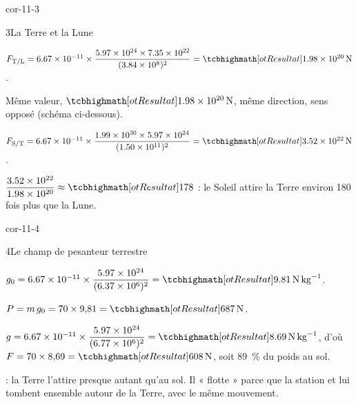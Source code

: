 \begin{blocLivre}{cor-11-3}
\begin{corrige}{3}{La Terre et la Lune}
\begin{questions}
\item $F_{\mathrm{T}/\mathrm{L}}=\num{6,67e-11}\times\dfrac{\num{5,97e24}\times\num{7,35e22}}{(\num{3,84e8})^2}=\res{\qty{1,98e20}{N}}$.
\item Même valeur, $\res{\qty{1,98e20}{N}}$, même direction, sens opposé (schéma ci-dessous).
\item $F_{\mathrm{S}/\mathrm{T}}=\num{6,67e-11}\times\dfrac{\num{1,99e30}\times\num{5,97e24}}{(\num{1,50e11})^2}=\res{\qty{3,52e22}{N}}$.
\item $\dfrac{\num{3,52e22}}{\num{1,98e20}}\approx\res{178}$ : le Soleil attire la Terre environ 180 fois plus que la Lune.
\end{questions}
\end{corrige}
\end{blocLivre}
\begin{blocLivre}{cor-11-4}
\begin{corrige}{4}{Le champ de pesanteur terrestre}
\begin{questions}
\item $g_0=\num{6,67e-11}\times\dfrac{\num{5,97e24}}{(\num{6,37e6})^2}=\res{\qty{9,81}{N.kg^{-1}}}$.
\item $P=m\,g_0=70\times9{,}81=\res{\qty{687}{N}}$.
\item $g=\num{6,67e-11}\times\dfrac{\num{5,97e24}}{(\num{6,77e6})^2}=\res{\qty{8,69}{N.kg^{-1}}}$, d'où $F=70\times8{,}69=\res{\qty{608}{N}}$, soit \qty{89}{\percent} du poids au sol.
\item {} : la Terre l'attire presque autant qu'au sol. Il « flotte » parce que la station et lui tombent ensemble autour de
la Terre, avec le même mouvement.
\end{questions}
\end{corrige}
\end{blocLivre}
